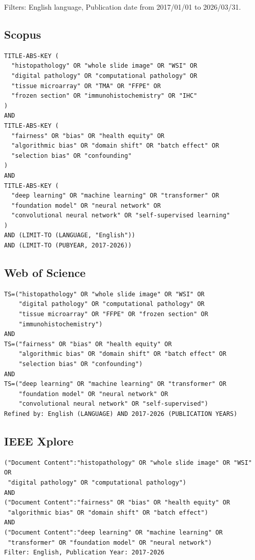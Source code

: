 Filters: English language, Publication date from 2017/01/01 to 2026/03/31.

\subsection*{Scopus}

\begin{verbatim}
TITLE-ABS-KEY (
  "histopathology" OR "whole slide image" OR "WSI" OR 
  "digital pathology" OR "computational pathology" OR 
  "tissue microarray" OR "TMA" OR "FFPE" OR 
  "frozen section" OR "immunohistochemistry" OR "IHC"
)
AND
TITLE-ABS-KEY (
  "fairness" OR "bias" OR "health equity" OR 
  "algorithmic bias" OR "domain shift" OR "batch effect" OR 
  "selection bias" OR "confounding"
)
AND
TITLE-ABS-KEY (
  "deep learning" OR "machine learning" OR "transformer" OR 
  "foundation model" OR "neural network" OR 
  "convolutional neural network" OR "self-supervised learning"
)
AND (LIMIT-TO (LANGUAGE, "English"))
AND (LIMIT-TO (PUBYEAR, 2017-2026))
\end{verbatim}

\subsection*{Web of Science}

\begin{verbatim}
TS=("histopathology" OR "whole slide image" OR "WSI" OR 
    "digital pathology" OR "computational pathology" OR 
    "tissue microarray" OR "FFPE" OR "frozen section" OR 
    "immunohistochemistry")
AND
TS=("fairness" OR "bias" OR "health equity" OR 
    "algorithmic bias" OR "domain shift" OR "batch effect" OR 
    "selection bias" OR "confounding")
AND
TS=("deep learning" OR "machine learning" OR "transformer" OR 
    "foundation model" OR "neural network" OR 
    "convolutional neural network" OR "self-supervised")
Refined by: English (LANGUAGE) AND 2017-2026 (PUBLICATION YEARS)
\end{verbatim}

\subsection*{IEEE Xplore}

\begin{verbatim}
("Document Content":"histopathology" OR "whole slide image" OR "WSI" OR 
 "digital pathology" OR "computational pathology")
AND
("Document Content":"fairness" OR "bias" OR "health equity" OR 
 "algorithmic bias" OR "domain shift" OR "batch effect")
AND
("Document Content":"deep learning" OR "machine learning" OR 
 "transformer" OR "foundation model" OR "neural network")
Filter: English, Publication Year: 2017-2026
\end{verbatim}


